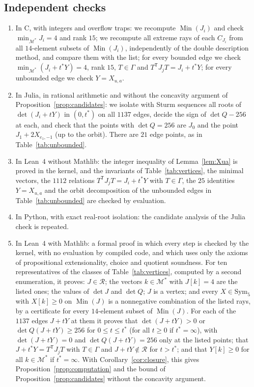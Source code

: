 \documentclass[11pt]{amsart}
\theoremstyle{definition}
\theoremstyle{remark}
\numberwithin{equation}{section}
\numberwithin{table}{section}
\numberwithin{figure}{section}
\newcommand{\M}{\mathcal{M}}
\newcommand{\Rk}{\mathcal{R}}
\newcommand{\Sym}{\mathrm{Sym}}
\newcommand{\Min}{\operatorname{Min}}
\begin{document}
\subsection*{Independent checks}
\begin{enumerate}
\item In C, with integers and overflow traps: we recompute $\Min(J_i)$ and check $\min_{\M^*}J_i=4$ and rank $15$; we recompute all extreme rays of each $C_{J_i}$ from all $14$-element subsets of $\Min(J_i)$, independently of the double description method, and compare them with the list; for every bounded edge we check $\min_{\M^*}(J_i+t^*Y)=4$, rank $15$, $T\in\Gamma$ and $T^{\mathsf T}J_jT=J_i+t^*Y$; for every unbounded edge we check $Y=X_{u,a}$.
\item In Julia, in rational arithmetic and without the concavity argument of Proposition~\ref{prop:candidates}: we isolate with Sturm sequences all roots of $\det(J_i+tY)$ in $(0,t^*)$ on all $1137$ edges, decide the sign of $\det Q-256$ at each, and check that the points with $\det Q=256$ are $J_0$ and the point $J_1+2X_{e_1,-1}$ (up to the orbit). There are $21$ edge points, as in Table~\ref{tab:unbounded}.
\item In Lean~4 without Mathlib: the integer inequality of Lemma~\ref{lem:Xua} is proved in the kernel, and the invariants of Table~\ref{tab:vertices}, the minimal vectors, the $1112$ relations $T^{\mathsf T}J_jT=J_i+t^*Y$ with $T\in\Gamma$, the $25$ identities $Y=X_{u,a}$ and the orbit decomposition of the unbounded edges in Table~\ref{tab:unbounded} are checked by evaluation.
\item In Python, with exact real-root isolation: the candidate analysis of the Julia check is repeated.
\item In Lean~4 with Mathlib: a formal proof in which every step is checked by the kernel, with no evaluation by compiled code, and which uses only the axioms of propositional extensionality, choice and quotient soundness. For ten representatives of the classes of Table~\ref{tab:vertices}, computed by a second enumeration, it proves: $J\in\Rk$; the vectors $k\in\M^*$ with $J[k]=4$ are the listed ones; the values of $\det J$ and $\det Q$; $J$ is a vertex; and every $X\in\Sym_5$ with $X[k]\ge0$ on $\Min(J)$ is a nonnegative combination of the listed rays, by a certificate for every $14$-element subset of $\Min(J)$. For each of the $1137$ edges $J+tY$ at them it proves that $\det(J+tY)>0$ or $\det Q(J+tY)\ge256$ for $0\le t\le t^*$ (for all $t\ge0$ if $t^*=\infty$), with $\det(J+tY)=0$ and $\det Q(J+tY)=256$ only at the listed points; that $J+t^*Y=T^{\mathsf T}J_jT$ with $T\in\Gamma$ and $J+tY\notin\Rk$ for $t>t^*$; and that $Y[k]\ge0$ for all $k\in\M^*$ if $t^*=\infty$. With Corollary~\ref{cor:closure}, this gives Proposition~\ref{prop:computation} and the bound of Proposition~\ref{prop:candidates} without the concavity argument.
\end{enumerate}
\end{document}
